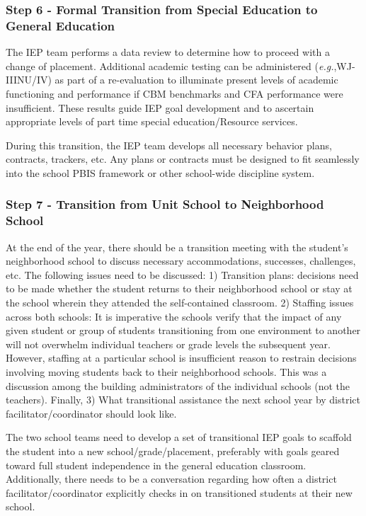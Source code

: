 \documentclass[twoside]{article}
\begin{document}
\subsubsection{Step 6 - Formal Transition from Special Education to General Education}
The IEP team performs a data review to determine how to proceed with a change of placement. Additional academic testing can be administered (\textit{e.g.},WJ-IIINU/IV) as part of a re-evaluation to illuminate present levels of academic functioning and performance if CBM benchmarks and CFA performance were insufficient. These results guide IEP goal development and to ascertain appropriate levels of part time special education/Resource services.

During this transition, the IEP team develops all necessary behavior plans, contracts, trackers, etc. Any plans or contracts must be designed to fit seamlessly into the school PBIS framework or other school-wide discipline system.

\subsubsection{Step 7 - Transition from Unit School to Neighborhood School}
At the end of the year, there should be a transition meeting with the student's neighborhood school to discuss necessary accommodations, successes, challenges, etc. The following issues need to be discussed: 1) Transition plans: decisions need to be made whether the student returns to their neighborhood school or stay at the school wherein they attended the self-contained classroom. 2) Staffing issues across both schools: It is imperative the schools verify that the impact of any given student or group of students transitioning from one environment to another will not overwhelm individual teachers or grade levels the subsequent year. However, staffing at a particular school is insufficient reason to restrain decisions involving moving students back to their neighborhood schools. This was a discussion among the building administrators of the individual schools (not the teachers). Finally, 3) What transitional assistance the next school year by district facilitator/coordinator should look like.

The two school teams need to develop a set of transitional IEP goals to scaffold the student into a new school/grade/placement, preferably with goals geared toward full student independence in the general education classroom. Additionally, there needs to be a conversation regarding how often a district facilitator/coordinator explicitly checks in on transitioned students at their new school.
%
\end{document}
